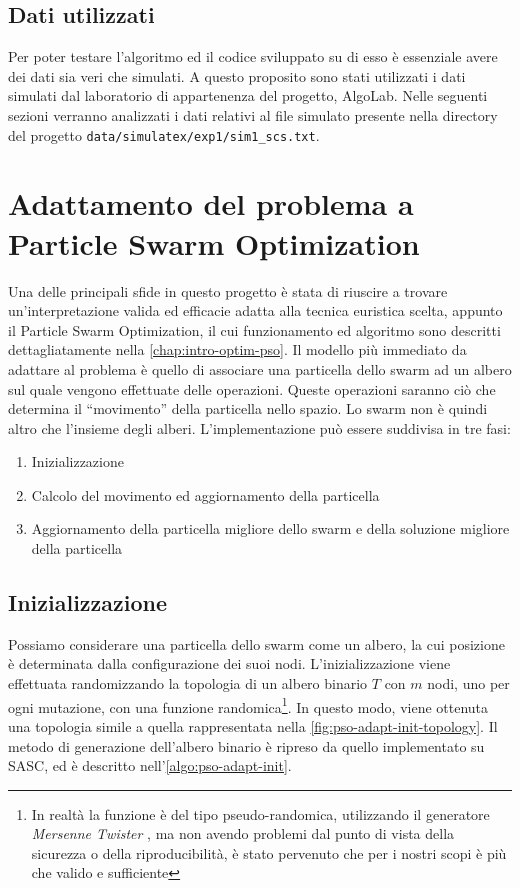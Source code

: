\subsection{Dati utilizzati}
Per poter testare l'algoritmo ed il codice sviluppato su di esso è essenziale avere dei dati sia veri che simulati. A questo proposito sono stati utilizzati i dati simulati dal laboratorio di appartenenza del progetto, AlgoLab. Nelle seguenti sezioni verranno analizzati i dati relativi al file simulato presente nella directory del progetto \texttt{data/simulatex/exp1/sim1\_scs.txt}.

\section{Adattamento del problema a Particle Swarm Optimization}
\label{chap:pso-adapt}
Una delle principali sfide in questo progetto è stata di riuscire a trovare un'interpretazione valida ed efficacie adatta alla tecnica euristica scelta, appunto il Particle Swarm Optimization, il cui funzionamento ed algoritmo sono descritti dettagliatamente nella \autoref{chap:intro-optim-pso}. Il modello più immediato da adattare al problema è quello di associare una particella dello swarm ad un albero sul quale vengono effettuate delle operazioni. Queste operazioni saranno ciò che determina il ``movimento'' della particella nello spazio. Lo swarm non è quindi altro che l'insieme degli alberi. L'implementazione può essere suddivisa in tre fasi: \begin{enumerate}
  \item Inizializzazione
  \item Calcolo del movimento ed aggiornamento della particella
  \item Aggiornamento della particella migliore dello swarm e della soluzione migliore della particella
\end{enumerate}

\subsection{Inizializzazione}
\label{chap:pso-adapt-init}
Possiamo considerare una particella dello swarm come un albero, la cui posizione è determinata dalla configurazione dei suoi nodi. L'inizializzazione viene effettuata randomizzando la topologia di un albero binario $T$ con $m$ nodi, uno per ogni mutazione, con una funzione randomica\footnote{In realtà la funzione è del tipo pseudo-randomica, utilizzando il generatore \textit{Mersenne Twister} \cite{Matsumoto:MersenneTwister}, ma non avendo problemi dal punto di vista della sicurezza o della riproducibilità, è stato pervenuto che per i nostri scopi è più che valido e sufficiente}. In questo modo, viene ottenuta una topologia simile a quella rappresentata nella \autoref{fig:pso-adapt-init-topology}. Il metodo di generazione dell'albero binario è ripreso da quello implementato su SASC, ed è descritto nell'\autoref{algo:pso-adapt-init}.

